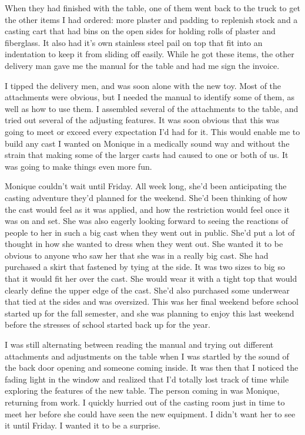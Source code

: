 When they had finished with the table, one of them went back to the truck to get the other
items I had ordered: more plaster and padding to replenish stock and a casting cart that had
bins on the open sides for holding rolls of plaster and fiberglass. It also had it's own
stainless steel pail on top that fit into an indentation to keep it from sliding off easily.
While he got these items, the other delivery man gave me the manual for the table and had me
sign the invoice.

I tipped the delivery men, and was soon alone with the new toy. Most of the attachments
were obvious, but I needed the manual to identify some of them, as well as how to use them. I
assembled several of the attachments to the table, and tried out several of the adjusting
features. It was soon obvious that this was going to meet or exceed every expectation I'd had
for it. This would enable me to build any cast I wanted on Monique in a medically sound way and
without the strain that making some of the larger casts had caused to one or both of us. It was
going to make things even more fun.

\begin{thought}
Monique couldn't wait until Friday. All week long, she'd been anticipating the casting
adventure they'd planned for the weekend. She'd been thinking of how the cast would feel as it
was applied, and how the restriction would feel once it was on and set. She was also eagerly
looking forward to seeing the reactions of people to her in such a big cast when they went out
in public. She'd put a lot of thought in how she wanted to dress when they went out. She wanted
it to be obvious to anyone who saw her that she was in a really big cast. She had purchased a
skirt that fastened by tying at the side. It was two sizes to big so that it would fit her over
the cast. She would wear it with a tight top that would clearly define the upper edge of the
cast. She'd also purchased some underwear that tied at the sides and was oversized. This was her
final weekend before school started up for the fall semester, and she was planning to enjoy this
last weekend before the stresses of school started back up for the year.
\end{thought}

I was still alternating between reading the manual and trying out different attachments and
adjustments on the table when I was startled by the sound of the back door opening and someone
coming inside. It was then that I noticed the fading light in the window and realized that I'd
totally lost track of time while exploring the features of the new table. The person coming in
was Monique, returning from work. I quickly hurried out of the casting room just in time to meet
her before she could have seen the new equipment. I didn't want her to see it until Friday. I
wanted it to be a surprise.

